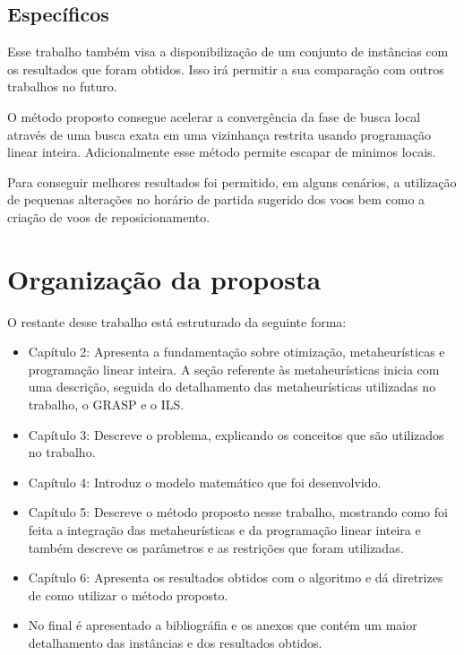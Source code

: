 \subsection{Específicos}

Esse trabalho também visa a disponibilização de um conjunto de instâncias com
os resultados que foram obtidos. Isso irá permitir a sua comparação com
outros trabalhos no futuro.

O método proposto consegue acelerar a convergência da fase de busca local
através de uma busca exata em uma vizinhança restrita usando programação
linear inteira. Adicionalmente esse método permite escapar de minimos locais.

Para conseguir melhores resultados foi permitido, em alguns cenários, a
utilização de pequenas alterações no horário de partida sugerido dos voos bem
como a criação de voos de reposicionamento.

\section {Organização da proposta }

O restante desse trabalho está estruturado da seguinte forma:

\begin{itemize}

\item Capítulo 2: Apresenta a fundamentação sobre otimização, metaheurísticas
e programação linear inteira. A seção referente às metaheurísticas inicia
com uma descrição, seguida do detalhamento das metaheurísticas utilizadas no trabalho,
o GRASP e o ILS.


\item Capítulo 3: Descreve o problema, explicando os conceitos que são
utilizados no trabalho.

\item Capítulo 4: Introduz o modelo matemático que foi desenvolvido.

\item Capítulo 5: Descreve o método proposto nesse trabalho, mostrando como foi
feita a integração das metaheurísticas e da programação linear inteira e também descreve os parâmetros e as restrições que foram utilizadas.

\item Capítulo 6: Apresenta os resultados obtidos com o algoritmo e dá
diretrizes de como utilizar o método proposto.

\item No final é apresentado a bibliográfia e os anexos que contém um maior
detalhamento das instâncias e dos resultados obtidos.

\end{itemize}